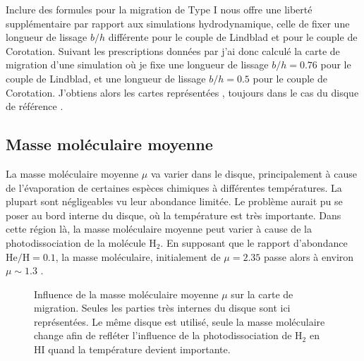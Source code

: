 Inclure des formules pour la migration de Type I nous offre une liberté supplémentaire par rapport aux simulations
hydrodynamique, celle de fixer une longueur de lissage $b/h$ différente pour le couple de Lindblad et pour le couple de
Corotation. Suivant les prescriptions données par \cite{masset2002coorbital} j'ai donc calculé la carte de migration d'une
simulation où je fixe une longueur de lissage $b/h=0.76$ pour le couple de Lindblad, et une longueur de lissage $b/h=0.5$ pour
le couple de Corotation. J'obtiens alors les cartes représentées , toujours dans le cas du disque
de référence . 

\subsection{Masse moléculaire moyenne}
La masse moléculaire moyenne $\mu$ va varier dans le disque, principalement à cause de l'évaporation de certaines
espèces chimiques à différentes températures. La plupart sont négligeables vu leur abondance limitée. Le problème
aurait pu se poser au bord interne du disque, où la température est très importante. Dans cette région là, la masse moléculaire
moyenne peut varier à cause de la photodissociation de la molécule $\mathrm{H_2}$. En supposant que le rapport d'abondance
$\mathrm{He/H}=0.1$, la masse moléculaire, initialement de $\mu=2.35$ passe alors à environ $\mu\sim 1.3$ \citep[Annexe
A]{hure2000transition}.

\begin{figure}[htbp]
\centering
{}\hfill
{}
\caption[Carte de migration pour différentes masses moléculaires moyennes.]{Influence de la masse moléculaire moyenne $\mu$ sur
la carte de migration. Seules les
parties très internes du disque sont ici représentées. Le même disque est utilisé, seule la masse
moléculaire change afin de refléter l'influence de la photodissociation de $\mathrm{H_2}$ en
$\mathrm{HI}$ quand la température devient importante. }\label{fig:migration_map_mmw}
\end{figure}

